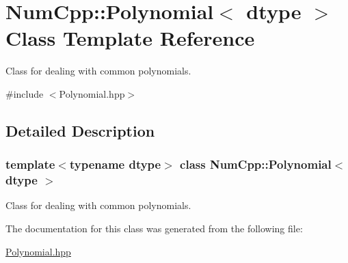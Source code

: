 \hypertarget{class_num_cpp_1_1_polynomial}{}\section{Num\+Cpp\+:\+:Polynomial$<$ dtype $>$ Class Template Reference}
\label{class_num_cpp_1_1_polynomial}


Class for dealing with common polynomials.  




{\ttfamily \#include $<$Polynomial.\+hpp$>$}



\subsection{Detailed Description}
\subsubsection*{template$<$typename dtype$>$\newline
class Num\+Cpp\+::\+Polynomial$<$ dtype $>$}

Class for dealing with common polynomials. 

The documentation for this class was generated from the following file\+:\begin{DoxyCompactItemize}
\item 
\mbox{\hyperlink{_polynomial_8hpp}{Polynomial.\+hpp}}\end{DoxyCompactItemize}
